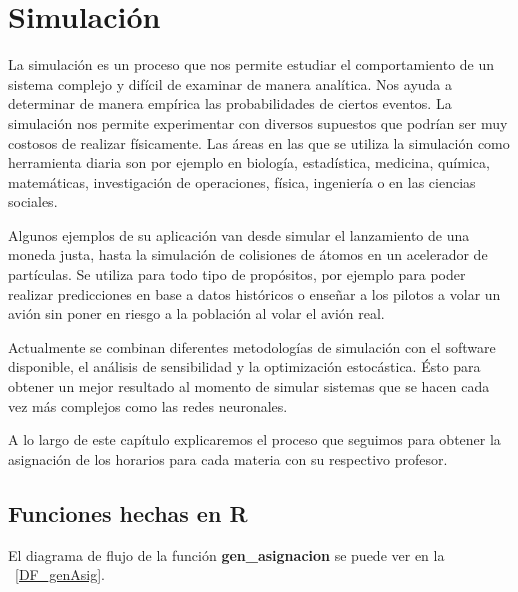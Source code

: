 \chapter{Simulación}

La simulación es un proceso que nos permite estudiar el comportamiento de un sistema complejo y difícil de examinar de manera analítica. Nos ayuda a determinar de manera empírica las probabilidades de ciertos eventos. La simulación nos permite experimentar con diversos supuestos que podrían ser muy costosos de realizar físicamente. Las áreas en las que se utiliza la simulación como herramienta diaria son por ejemplo en biología, estadística, medicina, química, matemáticas, investigación de operaciones, física, ingeniería o en las ciencias sociales.

Algunos ejemplos de su aplicación van desde simular el lanzamiento de una moneda justa, hasta la simulación de colisiones de átomos en un acelerador de partículas. Se utiliza para todo tipo de propósitos, por ejemplo para poder realizar predicciones en base a datos históricos o enseñar a los pilotos a volar un avión sin poner en riesgo a la población al volar el avión real.

Actualmente se combinan diferentes metodologías de simulación con el software disponible, el análisis de sensibilidad y la optimización estocástica. Ésto para obtener un mejor resultado al momento de simular sistemas que se hacen cada vez más complejos como las redes neuronales.

A lo largo de este capítulo explicaremos el proceso que seguimos para obtener la asignación de los horarios para cada materia con su respectivo profesor.


\section{Funciones hechas en R}

El diagrama de flujo de la función \textbf{gen\_asignacion} se puede ver en la \figurename{~\ref{DF_genAsig}}.


